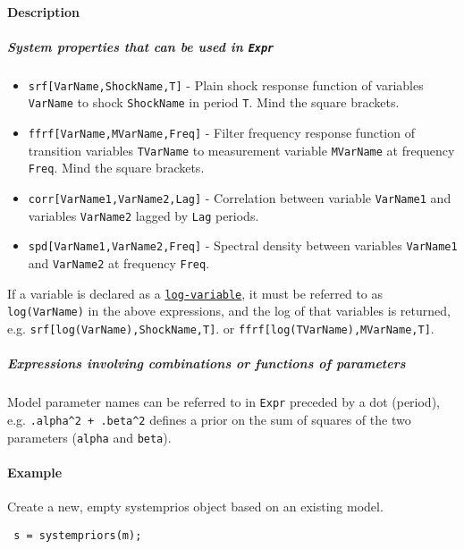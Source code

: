  \paragraph{Description}
 
 \subparagraph{System properties that can be used in \texttt{Expr}}
 
 \begin{itemize}
 \item
   \texttt{srf{[}VarName,ShockName,T{]}} - Plain shock response function
   of variables \texttt{VarName} to shock \texttt{ShockName} in period
   \texttt{T}. Mind the square brackets.
 \item
   \texttt{ffrf{[}VarName,MVarName,Freq{]}} - Filter frequency response
   function of transition variables \texttt{TVarName} to measurement
   variable \texttt{MVarName} at frequency \texttt{Freq}. Mind the square
   brackets.
 \item
   \texttt{corr{[}VarName1,VarName2,Lag{]}} - Correlation between
   variable \texttt{VarName1} and variables \texttt{VarName2} lagged by
   \texttt{Lag} periods.
 \item
   \texttt{spd{[}VarName1,VarName2,Freq{]}} - Spectral density between
   variables \texttt{VarName1} and \texttt{VarName2} at frequency
   \texttt{Freq}.
 \end{itemize}
 
 If a variable is declared as a
 \href{modellang/logvariables}{\texttt{log-variable}}, it must be
 referred to as \texttt{log(VarName)} in the above expressions, and the
 log of that variables is returned, e.g.
 \texttt{srf{[}log(VarName),ShockName,T{]}}. or
 \texttt{ffrf{[}log(TVarName),MVarName,T{]}}.
 
 \subparagraph{Expressions involving combinations or functions of
 parameters}
 
 Model parameter names can be referred to in \texttt{Expr} preceded by a
 dot (period), e.g. \texttt{.alpha\^{}2 + .beta\^{}2} defines a prior on
 the sum of squares of the two parameters (\texttt{alpha} and
 \texttt{beta}).
 
 \paragraph{Example}
 
 Create a new, empty systemprios object based on an existing model.
 
 \begin{verbatim}
 s = systempriors(m);
 \end{verbatim}
 
